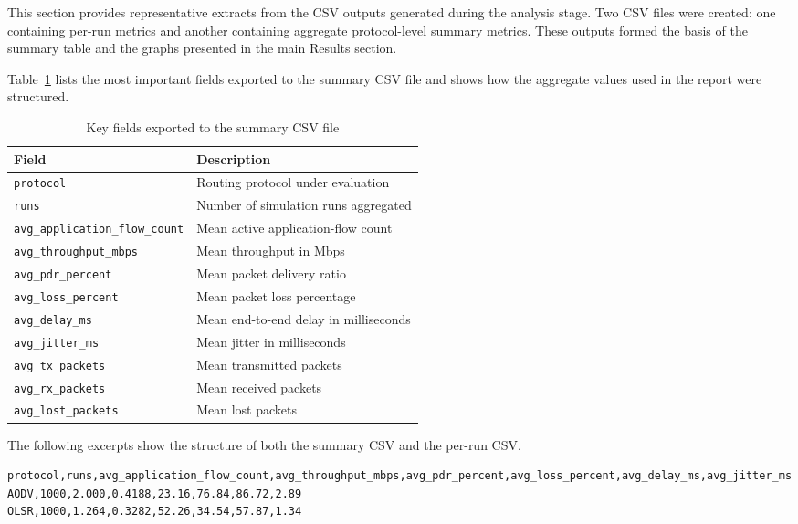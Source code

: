 \documentclass{Academic}
\begin{document}
This section provides representative extracts from the CSV outputs generated during the analysis stage. Two CSV files were created: one containing per-run metrics and another containing aggregate protocol-level summary metrics. These outputs formed the basis of the summary table and the graphs presented in the main Results section.

Table~\ref{tab:csv-fields} lists the most important fields exported to the summary CSV file and shows how the aggregate values used in the report were structured.

\begin{table}[htbp]
\centering
\caption{Key fields exported to the summary CSV file}
\label{tab:csv-fields}
\begin{tabular}{ll}
\toprule
\textbf{Field} & \textbf{Description} \\
\midrule
\texttt{protocol} & Routing protocol under evaluation \\
\texttt{runs} & Number of simulation runs aggregated \\
\texttt{avg\_application\_flow\_count} & Mean active application-flow count \\
\texttt{avg\_throughput\_mbps} & Mean throughput in Mbps \\
\texttt{avg\_pdr\_percent} & Mean packet delivery ratio \\
\texttt{avg\_loss\_percent} & Mean packet loss percentage \\
\texttt{avg\_delay\_ms} & Mean end-to-end delay in milliseconds \\
\texttt{avg\_jitter\_ms} & Mean jitter in milliseconds \\
\texttt{avg\_tx\_packets} & Mean transmitted packets \\
\texttt{avg\_rx\_packets} & Mean received packets \\
\texttt{avg\_lost\_packets} & Mean lost packets \\
\bottomrule
\end{tabular}
\end{table}

The following excerpts show the structure of both the summary CSV and the per-run CSV.

\begin{lstlisting}[caption={Excerpt from the summary CSV output}]
protocol,runs,avg_application_flow_count,avg_throughput_mbps,avg_pdr_percent,avg_loss_percent,avg_delay_ms,avg_jitter_ms
AODV,1000,2.000,0.4188,23.16,76.84,86.72,2.89
OLSR,1000,1.264,0.3282,52.26,34.54,57.87,1.34
\end{lstlisting}
\end{document}
